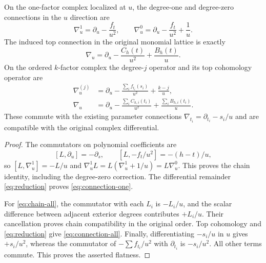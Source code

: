 \begin{theorem}
On the one-factor complex localized at $u$, the degree-one and
degree-zero connections in the $u$ direction are
\begin{equation}
 \nabla_u^1=\partial_u-\frac{f_t}{u^2},\qquad
 \nabla_u^0=\partial_u-\frac{f_t}{u^2}+\frac1u.
 \label{eq:chain-one}
\end{equation}
The induced top connection in the original monomial lattice is exactly
\begin{equation}
 \boxed{\nabla_u=\partial_u-\frac{C_h(t)}{u^2}
                                  +\frac{B_h(t)}u.}
 \label{eq:connection-one}
\end{equation}
On the ordered $k$-factor complex the degree-$j$ operator and its top
cohomology operator are
\begin{align}
 \nabla_u^{(j)}&=\partial_u-
       \frac{\sum_i f_{t_i}(s_i)}{u^2}+\frac{k-j}{u},
       \label{eq:chain-all}\\
 \boxed{\nabla_u}&=\boxed{\partial_u-
       \frac{\sum_i C_{h,i}(t_i)}{u^2}
                +\frac{\sum_i B_{h,i}(t_i)}u.}
       \label{eq:connection-all}
\end{align}
These commute with the existing parameter connections
$\nabla_{t_i}=\partial_{t_i}-s_i/u$ and are compatible with the
original complex differential.
\end{theorem}
\begin{proof}
The commutators on polynomial coefficients are
\[
 [L,\partial_u]=-\partial_s,\qquad
 [L,-f_t/u^2]=-(h-t)/u,
\]
so $[L,\nabla_u^1]=-L/u$ and
$\nabla_u^1L=L(\nabla_u^1+1/u)=L\nabla_u^0$.
This proves the chain identity, including the degree-zero correction.
The differential remainder \eqref{eq:reduction} proves
\eqref{eq:connection-one}.

For \eqref{eq:chain-all}, the commutator with each $L_i$ is
$-L_i/u$, and the scalar difference between adjacent exterior degrees
contributes $+L_i/u$.  Their cancellation proves chain compatibility
in the original order.  Top cohomology and
\eqref{eq:reduction} give \eqref{eq:connection-all}.
Finally, differentiating $-s_i/u$ in $u$ gives $+s_i/u^2$, whereas
the commutator of $-\sum f_{t_l}/u^2$ with $\partial_{t_i}$ is
$-s_i/u^2$.  All other terms commute.  This proves the asserted
flatness.
\end{proof}

